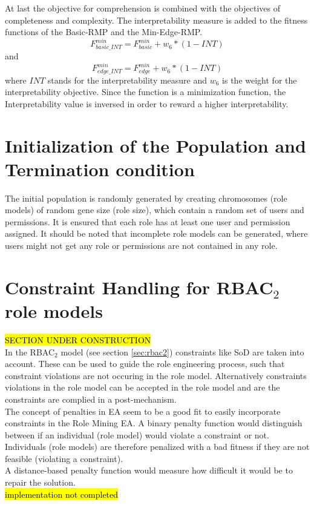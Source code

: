\begin{itemize}
            At last the objective for comprehension is combined with the objectives of completeness and complexity. The interpretability measure is added to the fitness functions of the Basic-RMP and the Min-Edge-RMP.
            \begin{equation}\label{eq:FBasicMin_INT}
                F_{basic\_INT}^{min} = F_{basic}^{min} + w_6 * (1-INT)
            \end{equation}
            and
            \begin{equation}\label{eq:FEdgeMin_INT}
                F_{edge\_INT}^{min} = F_{edge}^{min} + w_6 * (1-INT)
            \end{equation}
            where $INT$ stands for the interpretability measure and $w_6$ is the weight for the interpretability objective. Since the function is a minimization function, the Interpretability value is inversed in order to reward a higher interpretability.
        \end{itemize}
    
    \section{Initialization of the Population and Termination condition}
    The initial population is randomly generated by creating chromosomes (role models) of random gene size (role size), which contain a random set of users and permissions. It is ensured that each role has at least one user and permission assigned. It should be noted that incomplete role models can be generated, where users might not get any role or permissions are not contained in any role.
    
    \section{Constraint Handling for RBAC$_2$ role models}
    \hl{SECTION UNDER CONSTRUCTION}\\
    In the RBAC$_2$ model (see section \ref{sec:rbac2}) constraints like SoD are taken into account. These can be used to guide the role engineering process, such that constraint violations are not occuring in the role model. Alternatively constraints violations in the role model can be accepted in the role model and are the constraints are complied in a post-mechanism.\\
    The concept of penalties in EA seem to be a good fit to easily incorporate constraints in the Role Mining EA. A binary penalty function would distinguish between if an individual (role model) would violate a constraint or not. Individuals (role models) are therefore penalized with a bad fitness if they are not feasible (violating a constraint).\\
    A distance-based penalty function would measure how difficult it would be to repair the solution.\\
    \hl{implementation not completed}
    

